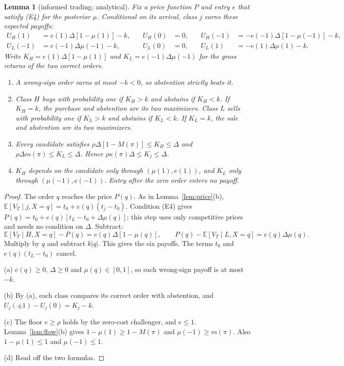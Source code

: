 \documentclass[11pt]{article}
\newtheorem{lemma}{Lemma}
\theoremstyle{definition}
\newcommand{\E}{\mathbb E}
\begin{document}
\begin{lemma}[informed trading; analytical]\label{lem:trade}
Fix a price function $P$ and entry $e$ that satisfy (E4) for the posterior $\mu$. Conditional on its arrival,
class $j$ earns these expected payoffs:
\[
\begin{aligned}
U_H(1)&=e(1)\Delta[1-\mu(1)]-k,&\quad U_H(0)&=0,&\quad U_H(-1)&=-e(-1)\Delta[1-\mu(-1)]-k,\\
U_L(-1)&=e(-1)\Delta\mu(-1)-k,&\quad U_L(0)&=0,&\quad U_L(1)&=-e(1)\Delta\mu(1)-k.
\end{aligned}
\]
Write $K_H=e(1)\Delta[1-\mu(1)]$ and $K_L=e(-1)\Delta\mu(-1)$ for the gross returns of the two correct orders.
\begin{enumerate}[label=(\alph*)]
\item A wrong-sign order earns at most $-k<0$, so abstention strictly beats it.
\item Class $H$ buys with probability one if $K_H>k$ and abstains if $K_H<k$. If $K_H=k$, the purchase and
  abstention are its two maximizers. Class $L$ sells with probability one if $K_L>k$ and abstains if $K_L<k$.
  If $K_L=k$, the sale and abstention are its two maximizers.
\item Every candidate satisfies $\rho\Delta[1-M(\pi)]\le K_H\le\Delta$ and $\rho\Delta m(\pi)\le K_L\le\Delta$.
  Hence $\rho\kappa(\pi)\Delta\le K_j\le\Delta$.
\item $K_H$ depends on the candidate only through $(\mu(1),e(1))$, and $K_L$ only through $(\mu(-1),e(-1))$.
  Entry after the zero order enters no payoff.
\end{enumerate}
\end{lemma}

\begin{proof}
The order $q$ reaches the price $P(q)$. As in Lemma~\ref{lem:price}(b), $\E[V_T\mid j,X=q]=t_0+e(q)(t_j-t_0)$.
Condition (E4) gives $P(q)=t_0+e(q)[t_L-t_0+\Delta\mu(q)]$; this step uses only competitive prices and
needs no condition on $\Delta$. Subtract:
\[
\E[V_T\mid H,X=q]-P(q)=e(q)\Delta[1-\mu(q)],\qquad P(q)-\E[V_T\mid L,X=q]=e(q)\Delta\mu(q).
\]
Multiply by $q$ and subtract $k|q|$. This gives the six payoffs. The terms $t_0$ and $e(q)(t_L-t_0)$ cancel.

(a) $e(q)\ge0$, $\Delta\ge0$ and $\mu(q)\in[0,1]$, so each wrong-sign payoff is at most $-k$.

(b) By (a), each class compares its correct order with abstention, and $U_j(\pm1)-U_j(0)=K_j-k$.

(c) The floor $e\ge\rho$ holds by the zero-cost challenger, and $e\le1$. Lemma~\ref{lem:flow}(b) gives
$1-\mu(1)\ge1-M(\pi)$ and $\mu(-1)\ge m(\pi)$. Also $1-\mu(1)\le1$ and $\mu(-1)\le1$.

(d) Read off the two formulas.
\end{proof}
\end{document}
